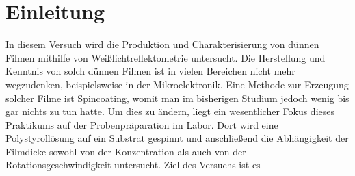 \section{\label{sec:einleitung}Einleitung}
In diesem Versuch wird die Produktion und Charakterisierung von dünnen Filmen mithilfe von Weißlichtreflektometrie untersucht. Die Herstellung und Kenntnis von solch dünnen Filmen ist in vielen Bereichen nicht mehr wegzudenken, beispielsweise in der Mikroelektronik.
Eine Methode zur Erzeugung solcher Filme ist Spincoating, womit man im bisherigen Studium jedoch wenig bis gar nichts zu tun hatte. Um dies zu ändern, liegt ein wesentlicher Fokus dieses Praktikums auf der Probenpräparation im Labor. Dort wird eine Polystyrollösung auf ein Substrat gespinnt und anschließend die Abhängigkeit der Filmdicke sowohl von der Konzentration als auch von der Rotationsgeschwindigkeit untersucht.
Ziel des Versuchs ist es 